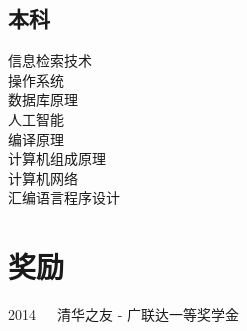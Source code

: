 \documentclass[]{resume_zh}
\begin{document}
\begin{minipage}[t]{0.3\textwidth}
\subsection{本科}
信息检索技术\\
操作系统\\
数据库原理\\
人工智能\\
编译原理\\
计算机组成原理\\
计算机网络\\
汇编语言程序设计\\
\sectionsep




\section{奖励} 
2014~~~清华之友 - 广联达一等奖学金\\
\sectionsep

%
%

\end{minipage} 
\hfill
\end{document}
